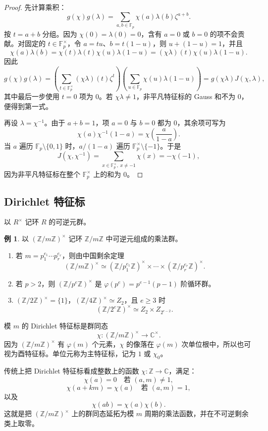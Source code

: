 \documentclass[11pt,a4paper,openany]{ctexbook}
\numberwithin{equation}{chapter}
\newcommand{\C}{\mathbb{C}}
\newcommand{\Z}{\mathbb{Z}}
\newcommand{\F}{\mathbb{F}}
\theoremstyle{plain}
\theoremstyle{definition}
\newtheorem{example}[theorem]{例}
\theoremstyle{remark}
\begin{document}
\begin{proof}
先计算乘积：
\[
g(\chi)g(\lambda)
=\sum_{a,b\in\F_p}\chi(a)\lambda(b)\zeta^{a+b}.
\]
按 $t=a+b$ 分组。因为 $\chi(0)=\lambda(0)=0$，含有 $a=0$ 或 $b=0$ 的项不会贡献。对固定的 $t\in\F_p^\times$，令 $a=tu$、$b=t(1-u)$，则 $u+(1-u)=1$，并且
\[
\chi(a)\lambda(b)=\chi(t)\lambda(t)\chi(u)\lambda(1-u)
=(\chi\lambda)(t)\chi(u)\lambda(1-u).
\]
因此
\[
g(\chi)g(\lambda)
=\left(\sum_{t\in\F_p^\times}(\chi\lambda)(t)\zeta^t\right)
\left(\sum_{u\in\F_p}\chi(u)\lambda(1-u)\right)
=g(\chi\lambda)J(\chi,\lambda),
\]
其中最后一步使用 $t=0$ 项为 $0$。若 $\chi\lambda\ne1$，非平凡特征标的 Gauss 和不为 $0$，便得到第一式。

再设 $\lambda=\chi^{-1}$。由于 $a+b=1$，项 $a=0$ 与 $b=0$ 都为 $0$，其余项可写为
\[
\chi(a)\chi^{-1}(1-a)=\chi\left(\frac{a}{1-a}\right).
\]
当 $a$ 遍历 $\F_p\setminus\{0,1\}$ 时，$a/(1-a)$ 遍历 $\F_p^\times\setminus\{-1\}$。于是
\[
J(\chi,\chi^{-1})
=\sum_{x\in\F_p^\times,\ x\ne-1}\chi(x)
=-\chi(-1),
\]
因为非平凡特征标在整个 $\F_p^\times$ 上的和为 $0$。
\end{proof}

\subsection{Dirichlet 特征标}

以 $R^\times$ 记环 $R$ 的可逆元群。

\begin{example}
以 $(\Z/m\Z)^\times$ 记环 $\Z/m\Z$ 中可逆元组成的乘法群。
\begin{enumerate}[label=(\arabic*)]
\item 若 $m=p_1^{e_1}\cdots p_r^{e_r}$，则由中国剩余定理
\[
(\Z/m\Z)^\times\simeq(\Z/p_1^{e_1}\Z)^\times\times\cdots\times(\Z/p_r^{e_r}\Z)^\times.
\]
\item 若 $p>2$，则 $(\Z/p^e\Z)^\times$ 是 $\varphi(p^e)=p^{e-1}(p-1)$ 阶循环群。
\item $(\Z/2\Z)^\times=\{1\}$，$(\Z/4\Z)^\times\simeq Z_2$，且 $e\ge3$ 时
\[
(\Z/2^e\Z)^\times\simeq Z_2\times Z_{2^{e-2}}.
\]
\end{enumerate}
\end{example}

模 $m$ 的 Dirichlet 特征标是群同态
\[
\chi:(\Z/m\Z)^\times\longrightarrow \C^\times.
\]
因为 $(\Z/m\Z)^\times$ 有 $\varphi(m)$ 个元素，$\chi$ 的像落在 $\varphi(m)$ 次单位根中，所以也可视为酉特征标。单位元称为主特征标，记为 $1$ 或 $\chi_0$。

传统上把 Dirichlet 特征标看成整数上的函数 $\chi:\Z\to\C$，满足：
\[
\chi(a)=0\quad\text{若 }(a,m)\ne1,
\]
\[
\chi(a+km)=\chi(a)\quad\text{若 }(a,m)=1,
\]
以及
\[
\chi(ab)=\chi(a)\chi(b).
\]
这就是把 $(\Z/m\Z)^\times$ 上的群同态延拓为模 $m$ 周期的乘法函数，并在不可逆剩余类上取零。
\end{document}
